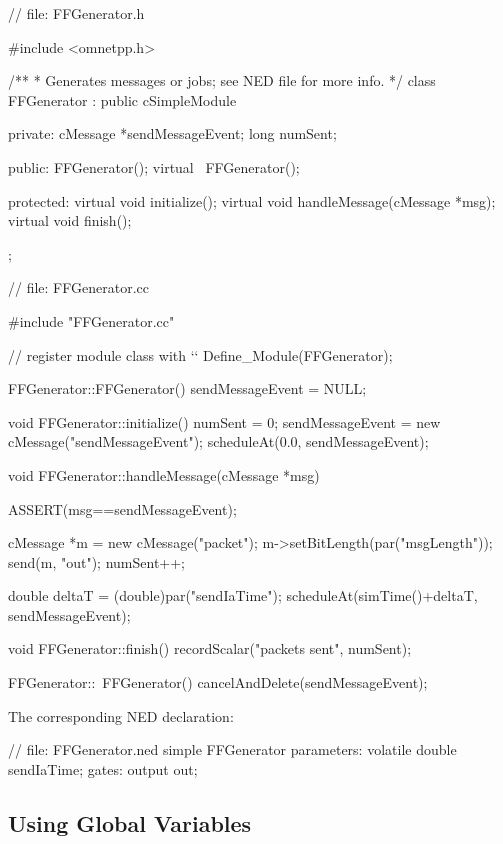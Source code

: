 \begin{cpp}
// file: FFGenerator.h

#include <omnetpp.h>

/**
 * Generates messages or jobs; see NED file for more info.
 */
class FFGenerator : public cSimpleModule
{
  private:
    cMessage *sendMessageEvent;
    long numSent;

  public:
    FFGenerator();
    virtual ~FFGenerator();

  protected:
    virtual void initialize();
    virtual void handleMessage(cMessage *msg);
    virtual void finish();
};
\end{cpp}

\begin{cpp}
// file: FFGenerator.cc

#include "FFGenerator.cc"

// register module class with `\opp`
Define_Module(FFGenerator);

FFGenerator::FFGenerator()
{
    sendMessageEvent = NULL;
}

void FFGenerator::initialize()
{
    numSent = 0;
    sendMessageEvent = new cMessage("sendMessageEvent");
    scheduleAt(0.0, sendMessageEvent);
}

void FFGenerator::handleMessage(cMessage *msg)
{
    ASSERT(msg==sendMessageEvent);

    cMessage *m = new cMessage("packet");
    m->setBitLength(par("msgLength"));
    send(m, "out");
    numSent++;

    double deltaT = (double)par("sendIaTime");
    scheduleAt(simTime()+deltaT, sendMessageEvent);
}

void FFGenerator::finish()
{
    recordScalar("packets sent", numSent);
}

FFGenerator::~FFGenerator()
{
    cancelAndDelete(sendMessageEvent);
}
\end{cpp}

The corresponding NED declaration:

\begin{ned}
// file: FFGenerator.ned
simple FFGenerator
{
    parameters:
        volatile double sendIaTime;
    gates:
        output out;
}
\end{ned}




\subsection{Using Global Variables}
\label{sec:simple-modules:global-vars}

